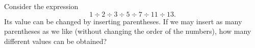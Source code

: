 Consider the expression
\[
1\div2\div3\div5\div7\div11\div13.
\]
Its value can be changed by inserting parentheses. If we may insert as many parentheses as we like (without changing the order of the numbers), how many different values can be obtained?
